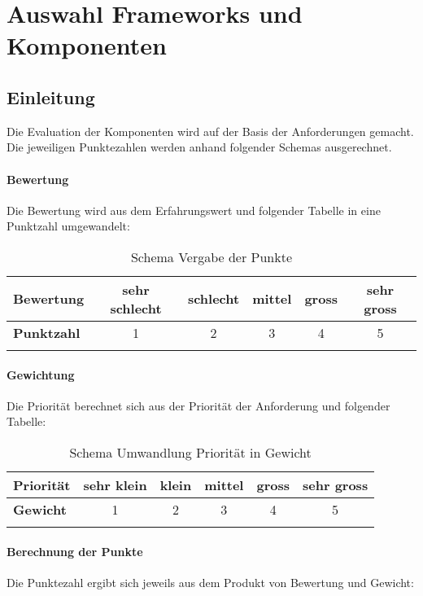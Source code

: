 \chapter{Auswahl Frameworks und Komponenten}\label{selection_rcp_fw}
\section{Einleitung}
Die Evaluation der Komponenten wird auf der Basis der Anforderungen gemacht. Die jeweiligen Punktezahlen werden anhand folgender Schemas ausgerechnet.
\subsubsection{Bewertung}
Die Bewertung wird aus dem Erfahrungswert und folgender Tabelle in eine Punktzahl umgewandelt:
\begin{longtable}{|l|c|c|c|c|c|}\hline
 \textbf{Bewertung} & sehr schlecht & schlecht & mittel & gross & sehr gross\\\hline
 \textbf{Punktzahl} & 1 & 2 & 3 & 4 & 5\\\hline
 \caption{Schema Vergabe der Punkte}
\end{longtable}

\subsubsection{Gewichtung}
Die Priorität berechnet sich aus der Priorität der Anforderung und folgender Tabelle:\begin{longtable}{|l|c|c|c|c|c|}\hline
 \textbf{Priorität} & sehr klein & klein & mittel & gross & sehr gross\\\hline
 \textbf{Gewicht} & 1 & 2 & 3 & 4 & 5\\\hline
 \caption{Schema Umwandlung Priorität in Gewicht}
\end{longtable}
\subsubsection{Berechnung der Punkte}
Die Punktezahl ergibt sich jeweils aus dem Produkt von Bewertung und Gewicht:
\begin{center}
\end{center}
